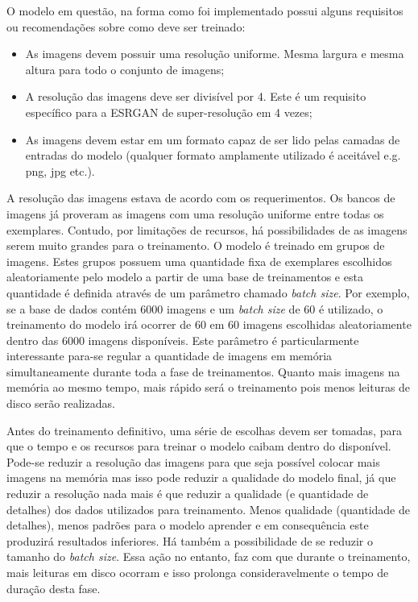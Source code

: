O modelo em questão, na forma como foi implementado possui alguns requisitos ou recomendações sobre como deve ser treinado:

\begin{itemize}
    \item As imagens devem possuir uma resolução uniforme. Mesma largura e mesma altura para todo o conjunto de imagens;

    \item A resolução das imagens deve ser divisível por 4. Este é um requisito específico para a ESRGAN de super-resolução em 4 vezes;

    \item As imagens devem estar em um formato capaz de ser lido pelas camadas de entradas do modelo (qualquer formato amplamente utilizado é aceitável e.g. png, jpg etc.).
\end{itemize}

A resolução das imagens estava de acordo com os requerimentos. Os bancos de imagens já proveram as imagens com uma resolução uniforme entre todas os exemplares. Contudo, por limitações de recursos, há possibilidades de as imagens serem muito grandes para o treinamento. O modelo é treinado em grupos de imagens. Estes grupos possuem uma quantidade fixa de exemplares escolhidos aleatoriamente pelo modelo a partir de uma base de treinamentos e esta quantidade é definida através de um parâmetro chamado \textit{batch size}. Por exemplo, se a base de dados contém 6000 imagens e um \textit{batch size} de 60 é utilizado, o treinamento do modelo irá ocorrer de 60 em 60 imagens escolhidas aleatoriamente dentro das 6000 imagens disponíveis. Este parâmetro é particularmente interessante para-se regular a quantidade de imagens em memória simultaneamente durante toda a fase de treinamentos. Quanto mais imagens na memória ao mesmo tempo, mais rápido será o treinamento pois menos leituras de disco serão realizadas.

Antes do treinamento definitivo, uma série de escolhas devem ser tomadas, para que o tempo e os recursos para treinar o modelo caibam dentro do disponível. Pode-se reduzir a resolução das imagens para que seja possível colocar mais imagens na memória mas isso pode reduzir a qualidade do modelo final, já que reduzir a resolução nada mais é que reduzir a qualidade (e quantidade de detalhes) dos dados utilizados para treinamento. Menos qualidade (quantidade de detalhes), menos padrões para o modelo aprender e em consequência este produzirá resultados inferiores. Há também a possibilidade de se  reduzir o tamanho do \textit{batch size}. Essa ação no entanto, faz com que durante o treinamento, mais leituras em disco ocorram e isso prolonga consideravelmente o tempo de duração desta fase.

